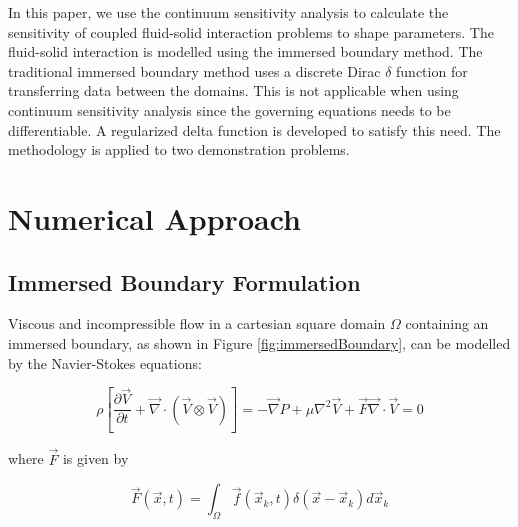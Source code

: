 \documentclass{aiaa-pretty}
\begin{document}
In this paper, we use the continuum sensitivity analysis to calculate the sensitivity of coupled fluid-solid interaction problems to shape parameters. The fluid-solid interaction is modelled using the immersed boundary method. The traditional immersed boundary method uses a discrete Dirac $\delta$ function for transferring data between the domains. This is not applicable when using continuum sensitivity analysis since the governing equations needs to be differentiable. A regularized delta function is developed to satisfy this need. The methodology is applied to two demonstration problems.

\section{Numerical Approach}
\subsection{Immersed Boundary Formulation}
Viscous and incompressible flow in a cartesian square domain $\Omega$ containing an immersed boundary, as shown in Figure \eqref{fig:immersedBoundary}, can be modelled by the Navier-Stokes equations:

%
\begin{subequations}\label{eq:NS}
\begin{equation}
	\rho \left[
	\frac{\partial \vec{V}}{\partial t} + 
	\vec{\nabla} \cdot \left( \vec{V} \otimes \vec{V} \right) 
	\right] = 
	-\vec{\nabla} P + \mu \nabla^2 \vec{V} + \vec{F}
\end{equation}
\begin{equation}
	\vec{\nabla} \cdot \vec{V} = 0
\end{equation}
\end{subequations}
%

where $\vec{F}$ is given by

%
\begin{equation}\label{eq:forceAtEulerian}
	\vec{F}(\vec{x}, t) = \int_\Omega \vec{f} (\vec{x}_k, t) \delta(\vec{x} - \vec{x}_k) d\vec{x}_k
\end{equation}
%
\end{document}
